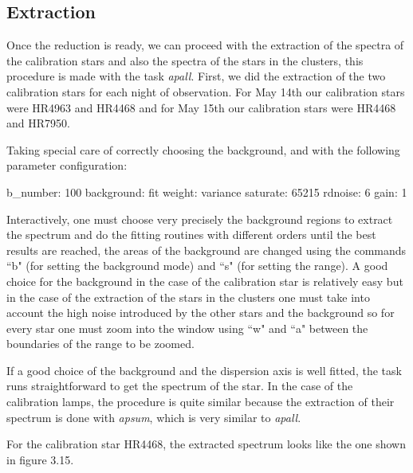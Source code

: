 \subsection{Extraction}

Once the reduction is ready, we can proceed with the extraction of the spectra of the calibration stars and also the spectra of the stars in the clusters, this procedure is made with the task \textit{apall}. First, we did the extraction of the two calibration stars for each night of observation. For May 14th our calibration stars were HR4963 and HR4468 and for May 15th our calibration stars were HR4468 and HR7950.

Taking special care of correctly choosing the background, and with the following parameter configuration:

b\_number: 100
background: fit
weight: variance
saturate: 65215
rdnoise: 6
gain: 1

Interactively, one must choose very precisely the background regions to extract the spectrum and do the fitting routines with different orders until the best results are reached, the areas of the background are changed using the commands ``b" (for setting the background mode) and ``s" (for setting the range). A good choice for the background in the case of the calibration star is relatively easy but in the case of the extraction of the stars in the clusters one must take into account the high noise introduced by the other stars and the background so for every star one must zoom into the window using ``w" and ``a" between the boundaries of the range to be zoomed.

If a good choice of the background and the dispersion axis is well fitted, the task runs straightforward to get the spectrum of the star. In the case of the calibration lamps, the procedure is quite similar because the extraction of their spectrum is done with \textit{apsum}, which is very similar to \textit{apall}. 

For the calibration star HR4468, the extracted spectrum looks like the one shown in figure 3.15.

